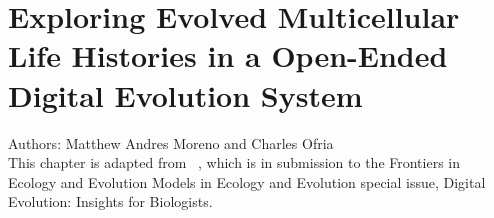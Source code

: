 \chapter{Exploring Evolved Multicellular Life Histories in a Open-Ended Digital Evolution System}
\label{ch:case-studies}

\noindent
Authors: Matthew Andres Moreno and Charles Ofria \\
This chapter is adapted from ~\citep{moreno2021exploring}, which is in submission to the Frontiers in Ecology and Evolution
Models in Ecology and Evolution special issue, Digital Evolution: Insights for Biologists.

